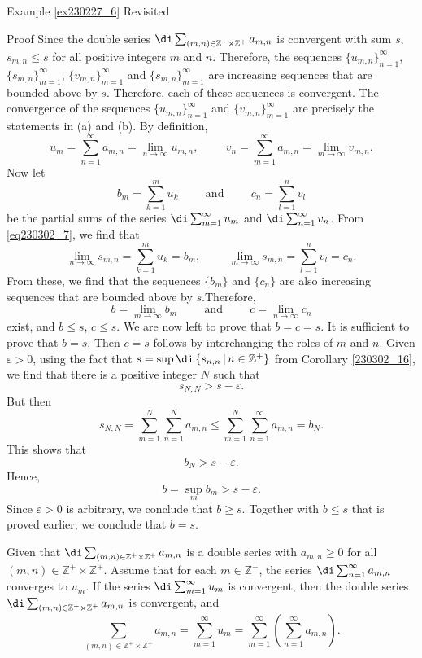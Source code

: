 \begin{example}{\linkt Example \ref{ex230227_6} Revisited}
\begin{example}[label=ex230227_13]{}
\begin{example}{}
\begin{example}[label=ex230301_6]{}
\begin{myproof}{Proof}
Since the double series $\di\sum_{(m,n)\in\mathbb{Z}^+\times\mathbb{Z}^+}a_{m,n}$ is convergent with sum $s$, $s_{m,n}\leq s$ for all positive integers $m$ and $n$. Therefore,
the sequences $\{u_{m,n}\}_{n=1}^{\infty}$, $\{s_{m,n}\}_{m=1}^{\infty}$, $\{v_{m,n}\}_{m=1}^{\infty}$ and $\{s_{m,n}\}_{m=1}^{\infty}$ are increasing sequences that are bounded above by $s$. 
Therefore, each of these sequences is convergent.  The convergence of the sequences $\{u_{m,n}\}_{n=1}^{\infty}$ and $\{v_{m,n}\}_{m=1}^{\infty}$ are precisely the statements in (a) and (b). By definition,
 \[u_m=\sum_{n=1}^{\infty}a_{m,n}=\lim_{n\to\infty}u_{m,n},\hspace{1cm}v_n=\sum_{m=1}^{\infty}a_{m,n}=\lim_{m\to\infty}v_{m,n}.\]
Now let
\[b_m=\sum_{k=1}^mu_k \hspace{1cm}\text{and}\hspace{1cm}c_n=\sum_{l=1}^nv_l\] be the partial sums of the series $\di\sum_{m=1}^{\infty}u_m$ and $\di\sum_{n=1}^{\infty}v_n$. 
From \eqref{eq230302_7}, we find that
\[\lim_{n\to\infty}s_{m,n}=\sum_{k=1}^mu_k=b_m,\hspace{1cm}\lim_{m\to\infty}s_{m,n}=\sum_{l=1}^nv_l=c_n.\]From these, we find that the sequences $\{b_m\}$ and $\{c_n\}$ are also increasing sequences that are bounded above by $s$.\bp Therefore, 
\[b=\lim_{m\to\infty}b_m\hspace{1cm}\text{and}\hspace{1cm}c=\lim_{n\to\infty}c_n\] exist, and $b\leq s$, $c\leq s$. We are now left to prove that $b=c=s$. It is sufficient to prove that $b=s$. Then $c=s$ follows by interchanging the roles of $m$ and $n$.
Given $\varepsilon>0$, using the fact that $s=\sup\di\left\{s_{n,n}\,|\,n\in\mathbb{Z}^+\right\}$ from Corollary \ref{230302_16}, we find that there is a positive integer $N$ such that
\[s_{N,N}>s-\varepsilon.\]But then
\[s_{N,N}=\sum_{m=1}^N\sum_{n=1}^Na_{m,n}\leq \sum_{m=1}^N\sum_{n=1}^{\infty}a_{m,n}=b_N.\]This shows that
\[b_N>s-\varepsilon.\]
Hence,
\[b=\sup_m b_m> s-\varepsilon.\] Since $\varepsilon>0$ is arbitrary, we conclude that $b\geq s$. Together with $b\leq s$ that is proved earlier, we conclude that $b=s$.

\end{myproof}


\begin{theorem}[label=230302_3]{}
Given that $\di\sum_{(m,n)\in\mathbb{Z}^+\times\mathbb{Z}^+}a_{m,n}$ is a double series with $a_{m,n}\geq 0$ for all $(m,n)\in\mathbb{Z}^+\times\mathbb{Z}^+$.
Assume that for each $m\in\mathbb{Z}^+$, the series $\di\sum_{n=1}^{\infty}a_{m,n}$ converges to $u_m$. If the series
$\di\sum_{m=1}^{\infty}u_m$ is convergent, then the double series $\di\sum_{(m,n)\in\mathbb{Z}^+\times\mathbb{Z}^+}a_{m,n}$ is convergent, and 
\[\sum_{(m,n)\in\mathbb{Z}^+\times\mathbb{Z}^+}a_{m,n}=\sum_{m=1}^{\infty}u_m=\sum_{m=1}^{\infty}\left( \sum_{n=1}^{\infty} a_{m,n}\right).\]


\end{theorem}
\end{example}
\end{example}
\end{example}
\end{example}
